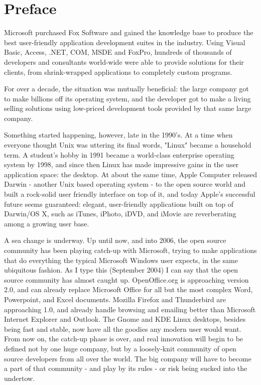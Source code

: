 
\chapter{Preface}

Microsoft purchased Fox Software and gained the knowledge base to produce the best user-friendly application development suites in the industry. Using Visual Basic, Access, .NET, COM, MSDE and FoxPro, hundreds of thousands of developers and consultants world-wide were able to provide solutions for their clients, from shrink-wrapped applications to completely custom programs.

For over a decade, the situation was mutually beneficial: the large company got to make billions off its operating system, and the developer got to make a living selling solutions using low-priced development tools provided by that same large company.

Something started happening, however, late in the 1990's. At a time when everyone thought Unix was uttering its final words, "Linux" became a household term. A student's hobby in 1991 became a world-class enterprise operating system by 1998, and since then Linux has made impressive gains in the user application space: the desktop. At about the same time, Apple Computer released Darwin - another Unix based operating system - to the open source world and built a rock-solid user friendly interface on top of it, and today Apple's successful future seems guaranteed: elegant, user-friendly applications built on top of Darwin/OS X, such as iTunes, iPhoto, iDVD, and iMovie are reverberating among a growing user base.

A sea change is underway. Up until now, and into 2006, the open source community has been playing catch-up with Microsoft, trying to make applications that do everything the typical Microsoft Windows user expects, in the same ubiquitous fashion. As I type this (September 2004) I can say that the open source community has almost caught up. OpenOffice.org is approaching version 2.0, and can already replace Microsoft Office for all but the most complex Word, Powerpoint, and Excel documents. Mozilla Firefox and Thunderbird are approaching 1.0, and already handle browsing and emailing better than Microsoft Internet Explorer and Outlook. The Gnome and KDE Linux desktops, besides being fast and stable, now have all the goodies any modern user would want. From now on, the catch-up phase is over, and real innovation will begin to be defined not by one huge company, but by a loosely-knit community of open source developers from all over the world. The big company will have to become a part of that community - and play by its rules - or risk being sucked into the undertow.

